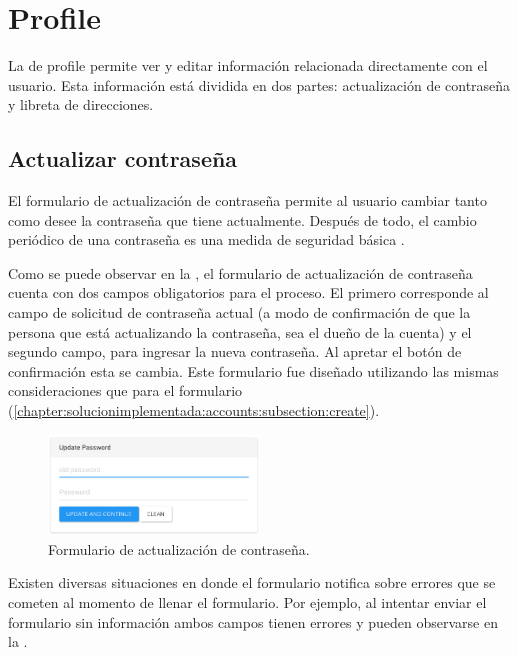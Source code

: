 \section{Profile}

	La \uiSiglaAS de profile permite ver y editar información relacionada directamente con el usuario. Esta información está dividida en dos partes: actualización de contraseña y libreta de direcciones.

	\subsection{Actualizar contraseña}

		El formulario de actualización de contraseña permite al usuario cambiar tanto como desee la contraseña que tiene actualmente. Después de todo, el cambio periódico de una contraseña es una medida de seguridad básica \cite{zviran1999password}.

		Como se puede observar en la , el formulario de actualización de contraseña cuenta con dos campos obligatorios para el proceso. El primero corresponde al campo de solicitud de contraseña actual (a modo de confirmación de que la persona que está actualizando la contraseña, sea el dueño de la cuenta) y el segundo campo, para ingresar la nueva contraseña. Al apretar el botón de confirmación esta se cambia. Este formulario fue diseñado utilizando las mismas consideraciones que para el formulario  (\ref{chapter:solucionimplementada:accounts:subsection:create}).

		\begin{figure}[h!]
			\centering
			\includegraphics[width=0.5\textwidth]{figuras/profile/form_update_password.png}

			\caption{Formulario de actualización de contraseña.}
			\label{figure:profile:form:form_update_password}
		\end{figure}

		Existen diversas situaciones en donde el formulario notifica sobre errores que se cometen  al momento de llenar el formulario. Por ejemplo, al intentar enviar el formulario sin información ambos campos tienen errores y pueden observarse en la .



